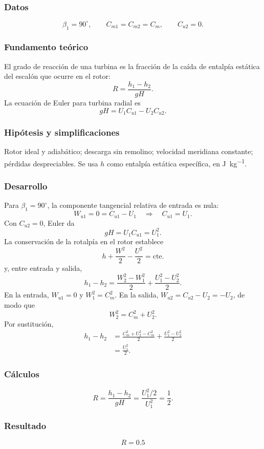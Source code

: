 \documentclass[12pt]{article}
\newcommand{\resultado}[1]{\[
  \boxed{\displaystyle #1}
\]}
\begin{document}
\subsubsection*{Datos}
\[
\beta_1=90^\circ,\qquad C_{m1}=C_{m2}=C_m,
\qquad C_{u2}=0.
\]

\subsubsection*{Fundamento teórico}
El grado de reacción de una turbina es la fracción de la caída de entalpía estática del escalón
que ocurre en el rotor:
\[
R=\frac{h_1-h_2}{gH}.
\]
La ecuación de Euler para turbina radial es
\[
gH=U_1C_{u1}-U_2C_{u2}.
\]

\subsubsection*{Hipótesis y simplificaciones}
Rotor ideal y adiabático; descarga sin remolino; velocidad meridiana constante; pérdidas
despreciables. Se usa $h$ como entalpía estática específica, en \si{J.kg^{-1}}.

\subsubsection*{Desarrollo}
Para $\beta_1=90^\circ$, la componente tangencial relativa de entrada es nula:
\[
W_{u1}=0=C_{u1}-U_1\quad\Longrightarrow\quad C_{u1}=U_1.
\]
Con $C_{u2}=0$, Euler da
\[
gH=U_1C_{u1}=U_1^2.
\]
La conservación de la rotalpía en el rotor establece
\[
h+\frac{W^2}{2}-\frac{U^2}{2}=\mathrm{cte.}
\]
y, entre entrada y salida,
\[
h_1-h_2=\frac{W_2^2-W_1^2}{2}
+\frac{U_1^2-U_2^2}{2}.
\]
En la entrada, $W_{u1}=0$ y $W_1^2=C_m^2$. En la salida,
$W_{u2}=C_{u2}-U_2=-U_2$, de modo que
\[
W_2^2=C_m^2+U_2^2.
\]
Por sustitución,
\begin{align*}
h_1-h_2
&=\frac{C_m^2+U_2^2-C_m^2}{2}
+\frac{U_1^2-U_2^2}{2}\\
&=\frac{U_1^2}{2}.
\end{align*}

\subsubsection*{Cálculos}
\[
R=\frac{h_1-h_2}{gH}
=\frac{U_1^2/2}{U_1^2}=\frac{1}{2}.
\]

\subsubsection*{Resultado}
\resultado{R=0.5}
\end{document}
